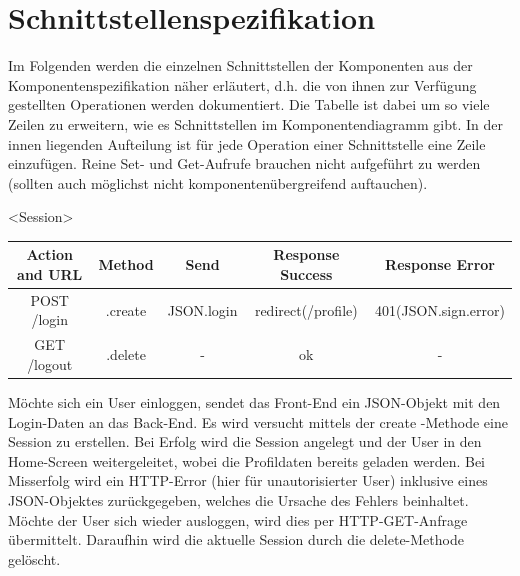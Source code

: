 \newpage
\section{Schnittstellenspezifikation}

Im Folgenden werden die einzelnen Schnittstellen der Komponenten aus der
Komponentenspezifikation näher erläutert, d.h. die von ihnen zur Verfügung
gestellten Operationen werden dokumentiert. Die Tabelle ist dabei um so viele
Zeilen zu erweitern, wie es Schnittstellen im Komponentendiagramm gibt. In der
innen liegenden Aufteilung ist für jede Operation einer Schnittstelle eine
Zeile einzufügen.  Reine Set- und Get-Aufrufe brauchen nicht aufgeführt zu
werden (sollten auch möglichst nicht komponentenübergreifend auftauchen).

\begin{interface}{10}{<Session>}

\begin{center}
	\begin{tabular}[h]{|c|c|c|c|c|}
	\hline
	\textbf{Action and URL} &\textbf {Method} &\textbf {Send} &\textbf {Response Success} & \textbf{Response Error}\\
	\hline
	POST    /login & .create  & JSON.login  & redirect(/profile)  & 401(JSON.sign.error) \\
	\hline
	GET     /logout & .delete & - & ok & - \\
	\hline
	 \end{tabular}
\end{center}

\end{interface}

Möchte sich ein User einloggen, sendet das Front-End ein JSON-Objekt mit den Login-Daten an das Back-End. Es wird versucht mittels der \glqq create \grqq -Methode eine Session zu erstellen. Bei Erfolg wird die Session angelegt und der User in den Home-Screen weitergeleitet, wobei die Profildaten bereits geladen werden. Bei Misserfolg wird ein HTTP-Error (hier für unautorisierter User) inklusive eines JSON-Objektes zurückgegeben, welches die Ursache des Fehlers beinhaltet.
Möchte der User sich wieder ausloggen, wird dies per HTTP-GET-Anfrage übermittelt. Daraufhin wird die aktuelle Session durch die \glqq delete\grqq -Methode gelöscht.

